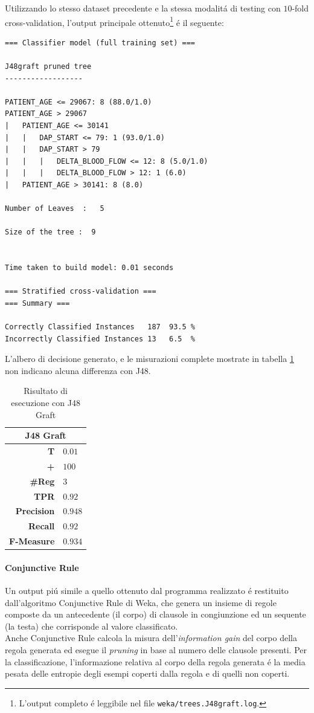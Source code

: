 \documentclass[preprint]{acm_proc_article-sp}
\begin{document}
Utilizzando lo stesso dataset precedente e la stessa modalit\'a di testing con $10$-fold cross-validation, l'output principale ottenuto\footnote{L'output completo \'e leggibile nel file \verb|weka/trees.J48graft.log|.} \'e il seguente:
\begin{verbatim}
=== Classifier model (full training set) ===

J48graft pruned tree
------------------

PATIENT_AGE <= 29067: 8 (88.0/1.0)
PATIENT_AGE > 29067
|   PATIENT_AGE <= 30141
|   |   DAP_START <= 79: 1 (93.0/1.0)
|   |   DAP_START > 79
|   |   |   DELTA_BLOOD_FLOW <= 12: 8 (5.0/1.0)
|   |   |   DELTA_BLOOD_FLOW > 12: 1 (6.0)
|   PATIENT_AGE > 30141: 8 (8.0)

Number of Leaves  :   5

Size of the tree :  9


Time taken to build model: 0.01 seconds

=== Stratified cross-validation ===
=== Summary ===

Correctly Classified Instances   187  93.5 %
Incorrectly Classified Instances 13   6.5  %
\end{verbatim}

L'albero di decisione generato, e le misurazioni complete mostrate in tabella \ref{table:risultati-j48-graft} non indicano alcuna differenza con J48.

\begin{table}[h]
\centering
\begin{tabular}{|r|l|} \hline
\multicolumn{2}{|c|}{\textbf{J48 Graft}} \\ \hline \hline 
\textbf{T} & $0.01$ \\ \hline
\textbf{+} & $100$ \\ \hline
\textbf{\#Reg} & $3$\\ \hline
\textbf{TPR} & $0.92$ \\ \hline
\textbf{Precision} & $0.948$ \\ \hline
\textbf{Recall} & $0.92$ \\  \hline
\textbf{F-Measure} & $0.934$ \\
\hline\end{tabular}
\caption{Risultato di esecuzione con J48 Graft}
\label{table:risultati-j48-graft}
\end{table}

\paragraph{Conjunctive Rule}
Un output pi\'u simile a quello ottenuto dal programma realizzato \'e restituito dall'algoritmo Conjunctive Rule di Weka, che genera un insieme di regole composte da un antecedente (il corpo) di clausole in congiunzione ed un sequente (la testa) che corrisponde al valore classificato.\\
Anche Conjunctive Rule calcola la misura dell'\textit{information gain} del corpo della regola generata ed esegue il \textit{pruning} in base al numero delle clausole presenti. Per la classificazione, l'informazione relativa al corpo della regola generata \'e la media pesata delle entropie degli esempi coperti dalla regola e di quelli non coperti.
\end{document}
